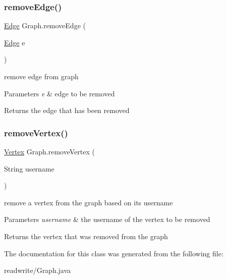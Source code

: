\subsubsection{\texorpdfstring{remove\+Edge()}{removeEdge()}}
{\footnotesize\ttfamily \hyperlink{class_edge}{Edge} Graph.\+remove\+Edge (\begin{DoxyParamCaption}\item[{\hyperlink{class_edge}{Edge}}]{e }\end{DoxyParamCaption})}



remove edge from graph 


\begin{DoxyParams}{Parameters}
{\em e} & edge to be removed \\
\hline
\end{DoxyParams}
\begin{DoxyReturn}{Returns}
the edge that has been removed 
\end{DoxyReturn}
\mbox{\label{class_graph_a1253c513b85d91e2c6f60e36863c2fc9}} 
\subsubsection{\texorpdfstring{remove\+Vertex()}{removeVertex()}}
{\footnotesize\ttfamily \hyperlink{class_vertex}{Vertex} Graph.\+remove\+Vertex (\begin{DoxyParamCaption}\item[{String}]{username }\end{DoxyParamCaption})}



remove a vertex from the graph based on its username 


\begin{DoxyParams}{Parameters}
{\em username} & the username of the vertex to be removed \\
\hline
\end{DoxyParams}
\begin{DoxyReturn}{Returns}
the vertex that was removed from the graph 
\end{DoxyReturn}


The documentation for this class was generated from the following file\+:\begin{DoxyCompactItemize}
\item 
readwrite/Graph.\+java\end{DoxyCompactItemize}
